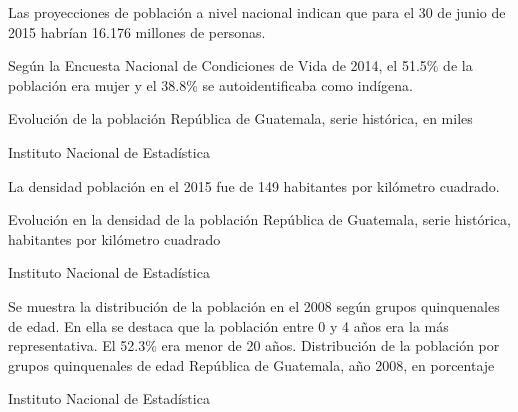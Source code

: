 
{%
Las proyecciones de población a nivel nacional indican que para el 30 de junio de 2015 habrían 16.176 millones de personas.

Según la Encuesta Nacional de Condiciones de Vida de 2014, el 51.5\% de la población era mujer y el 38.8\% se autoidentificaba como indígena. }%
{%
 Evolución de la población} %
{%
 República de Guatemala, serie histórica, en miles} %
{%
 \begin{tikzpicture}[x=1pt,y=1pt]    \end{tikzpicture}}%
{%
 Instituto Nacional de Estadística} %





 {%
La densidad población en el 2015 fue de 149 habitantes por kilómetro cuadrado.

}%
 {%
 Evolución en la densidad de la población} %
 {%
 	República de Guatemala, serie histórica, habitantes por kilómetro cuadrado} %
 {%
 	\begin{tikzpicture}[x=1pt,y=1pt]    \end{tikzpicture}}%
 {%
 	Instituto Nacional de Estadística} %
 
 
 
 
 

 {%
 Se muestra la distribución de la población en el 2008 según grupos quinquenales de edad. En ella se destaca que la población entre 0 y 4 años era la más representativa. El 52.3\% era menor de 20 años.
   }%
 {%
 	Distribución de la población por grupos quinquenales de edad} %
 {%
 	República de Guatemala, año 2008, en porcentaje} %
 {%
 	\begin{tikzpicture}[x=1pt,y=1pt]    \end{tikzpicture}}%
 {%
 	Instituto Nacional de Estadística} %
 
